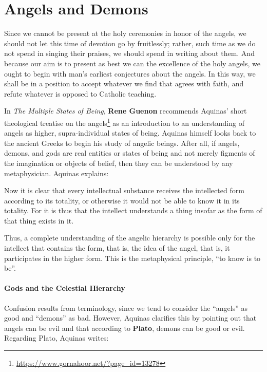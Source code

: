 \section{Angels and Demons}

\begin{quotex}
Since we cannot be present at the holy ceremonies in honor of the angels, we should not let this time of devotion go by fruitlessly; rather, such time as we do not spend in singing their praises, we should spend in writing about them. And because our aim is to present as best we can the excellence of the holy angels, we ought to begin with man's earliest conjectures about the angels. In this way, we shall be in a position to accept whatever we find that agrees with faith, and refute whatever is opposed to Catholic teaching. 

\end{quotex}
In \textit{The Multiple States of Being}, \textbf{Rene Guenon} recommends Aquinas' short theological treatise on the angels\footnote{\url{https://www.gornahoor.net/?page_id=13278}} as an introduction to an understanding of angels as higher, supra-individual states of being. Aquinas himself looks back to the ancient Greeks to begin his study of angelic beings. After all, if angels, demons, and gods are real entities or states of being and not merely figments of the imagination or objects of belief, then they can be understood by any metaphysician. Aquinas explains:

\begin{quotex}
Now it is clear that every intellectual substance receives the intellected form according to its totality, or otherwise it would not be able to know it in its totality. For it is thus that the intellect understands a thing insofar as the form of that thing exists in it.

\end{quotex}
Thus, a complete understanding of the angelic hierarchy is possible only for the intellect that contains the form, that is, the idea of the angel, that is, it participates in the higher form. This is the metaphysical principle, ``to know is to be''.

\paragraph{Gods and the Celestial Hierarchy}
Confusion results from terminology, since we tend to consider the “angels” as good and “demons” as bad. However, Aquinas clarifies this by pointing out that angels can be evil and that according to \textbf{Plato}, demons can be good or evil. Regarding Plato, Aquinas writes:


